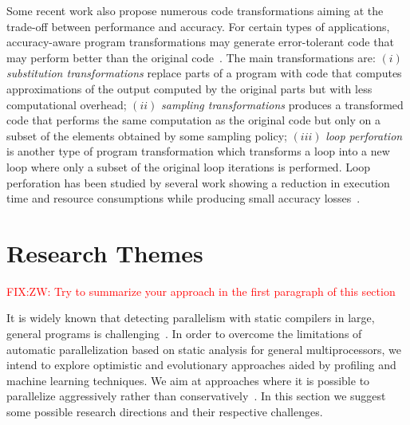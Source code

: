 \documentclass[a4paper,12pt]{article}
\newcommand{\etal}{et~al.}
\newcommand\FIXME[1]{\textcolor{red}{FIX:}\textcolor{red}{#1}}
\begin{document}
Some recent work also propose numerous code transformations aiming at the
trade-off between performance and accuracy.  For certain types of applications,
accuracy-aware program transformations may generate error-tolerant code that
may perform better than the original code~\cite{zhu12}.  The main
transformations are: $(i)$ {\em substitution transformations} replace parts of
a program with code that computes approximations of the output computed by the
original parts but with less computational overhead; $(ii)$ {\em sampling
transformations} produces a transformed code that performs the same computation
as the original code but only on a subset of the elements obtained by some
sampling policy; $(iii)$ {\em loop perforation} is another type of program
transformation which transforms a loop into a new loop where only a subset of
the original loop iterations is performed. Loop perforation has been studied by
several work showing a reduction in execution time and resource consumptions
while producing small accuracy losses~\cite{misailovic11,douskos11}.



\section{Research Themes}\label{sec:research-dir}

\FIXME{ZW: Try to summarize your approach in the first paragraph of this section}

It is widely known that detecting parallelism with static compilers in large,
general programs is challenging~\cite{kennedy01,chen03}.  In order to overcome
the limitations of automatic parallelization based on static analysis for
general multiprocessors, we intend to explore optimistic and evolutionary
approaches aided by profiling and machine learning techniques.  We aim at
approaches where it is possible to parallelize aggressively rather than
conservatively~\cite{chen03,williams96,williams99}. In this section we suggest
some possible research directions and their respective challenges.
\end{document}
